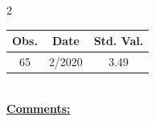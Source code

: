 
\bigskip 
\begin{multicols}{2}{ 
\begin{tabular}{ccc}
\hline  Obs.  &  Date &  Std. Val. \\ 
\hline 
                       65 &        2/2020 &          3.49 \vspace{-.12in} \\  
 \end{tabular} 
\\ 
 \columnbreak 
 \singlespacing 
 \underline{\textbf{Comments:}} \\ 
 \bigskip       

 } 
\end{multicols} 
